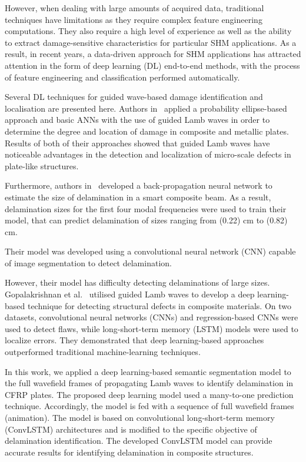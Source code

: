 \documentclass{IOS-Book-Article}
\begin{document}
\begin{sloppypar}
	However, when dealing with large amounts of acquired data, traditional techniques have limitations as they require complex feature engineering computations.
	They also require a high level of experience as well as the ability to extract damage-sensitive characteristics for particular SHM applications.
	As a result, in recent years, a data-driven approach for SHM applications has attracted attention in the form of deep learning (DL) end-to-end methods, with the process of feature engineering and classification performed automatically.
	
	Several DL techniques for guided wave-based damage identification and localisation are presented here.
	Authors in~\cite{DeFenza2015a} applied a probability ellipse-based approach and 
	basic ANNs with the use of guided Lamb waves in order to  determine the degree 
	and location of damage in composite and metallic plates. Results of both of 
	their approaches showed that guided Lamb waves have noticeable advantages in 
	the detection and localization of micro-scale defects in plate-like 
	structures. 
	
	Furthermore, authors in~\cite{okafor1996delamination} developed a back-propagation neural network to estimate the size of delamination in a smart composite beam.
	As a result, delamination sizes for the first four modal frequencies were used to train their model, that can predict delamination of sizes ranging from (0.22) cm to (0.82) cm.
	
	Their model was developed using a convolutional neural network (CNN) capable of image segmentation to detect delamination.
	
	However, their model has difficulty detecting delaminations of large sizes.
	Gopalakrishnan et al.~\cite{Gopalakrishnan2021} utilised guided Lamb waves to develop a deep learning-based technique for detecting structural defects in composite materials.
	On two datasets, convolutional neural networks (CNNs) and regression-based CNNs were used to detect flaws, while long-short-term memory (LSTM) models were used to localize errors.
	They demonstrated that deep learning-based approaches outperformed traditional machine-learning techniques.
	
	In this work, we applied a deep learning-based semantic segmentation model to the full wavefield frames of propagating Lamb waves to identify delamination in CFRP plates.
	The proposed deep learning model used a many-to-one prediction technique.
	Accordingly, the model is fed with a sequence of full wavefield frames (animation).
	The model is based on convolutional long-short-term memory (ConvLSTM) architectures and is modified to the specific objective of delamination identification.
	The developed ConvLSTM model can provide accurate results for identifying delamination in composite structures.
\end{sloppypar}
\end{document}
